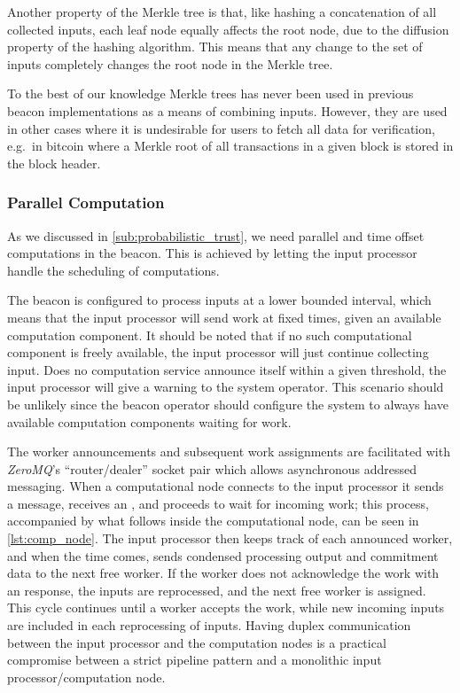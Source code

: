Another property of the Merkle tree is that, like hashing a concatenation of all collected inputs, each leaf node equally affects the root node, due to the diffusion property of the hashing algorithm.
This means that any change to the set of inputs completely changes the root node in the Merkle tree.

To the best of our knowledge Merkle trees has never been used in previous beacon implementations as a means of combining inputs.
However, they are used in other cases where it is undesirable for users to fetch all data for verification, e.g.\ in bitcoin where a Merkle root of all transactions in a given block is stored in the block header.

\subsubsection{Parallel Computation}%
\label{ssub:parallel_computation}
As we discussed in \cref{sub:probabilistic_trust}, we need parallel and time offset computations in the beacon.
This is achieved by letting the input processor handle the scheduling of computations.

The beacon is configured to process inputs at a lower bounded interval, which means that the input processor will send work at fixed times, given an available computation component.
It should be noted that if no such computational component is freely available, the input processor will just continue collecting input.
Does no computation service announce itself within a given threshold, the input processor will give a warning to the system operator.
This scenario should be unlikely since the beacon operator should configure the system to always have available computation components waiting for work.

The worker announcements and subsequent work assignments are facilitated with \textit{ZeroMQ}'s \enquote{router/\allowbreak{}dealer} socket pair which allows asynchronous addressed messaging.
When a computational node connects to the input processor it sends a  message, receives an , and proceeds to wait for incoming work; this process, accompanied by what follows inside the computational node, can be seen in \cref{lst:comp_node}.
The input processor then keeps track of each announced worker, and when the time comes, sends condensed processing output and commitment data to the next free worker.
If the worker does not acknowledge the work with an  response, the inputs are reprocessed, and the next free worker is assigned.
This cycle continues until a worker accepts the work, while new incoming inputs are included in each reprocessing of inputs.
Having duplex communication between the input processor and the computation nodes is a practical compromise between a strict pipeline pattern and a monolithic input processor/computation node.

